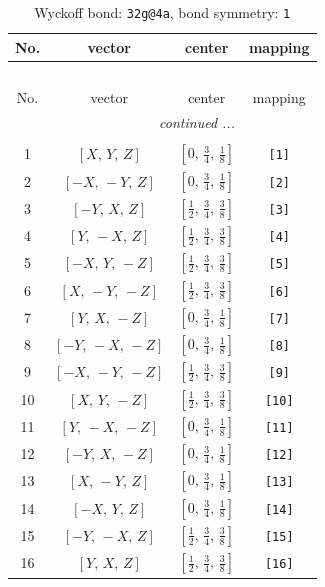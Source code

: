 \documentclass[fleqn,8pt]{jsarticle}
\begin{document}
\begin{longtable}{cccc}
\caption{Wyckoff bond: {\tt 32g@4a}, bond symmetry: {\tt 1}}
 \\
 \hline \hline
No. & vector & center & mapping \\ \hline \endfirsthead

\multicolumn{3}{l}{\tablename\ \thetable{}} \\
 \hline \hline
No. & vector & center & mapping \\ \hline \endhead

 \hline \hline
\multicolumn{3}{r}{\footnotesize\it continued ...} \\ \endfoot

 \hline \hline
\multicolumn{3}{r}{} \\ \endlastfoot

1 & $\left[ X,\, Y,\, Z \right]$ & $\left[ 0,\, \frac{3}{4},\, \frac{1}{8} \right]$ & {\tt [1]} \\ \hline
2 & $\left[ - X,\, - Y,\, Z \right]$ & $\left[ 0,\, \frac{3}{4},\, \frac{1}{8} \right]$ & {\tt [2]} \\ \hline
3 & $\left[ - Y,\, X,\, Z \right]$ & $\left[ \frac{1}{2},\, \frac{3}{4},\, \frac{3}{8} \right]$ & {\tt [3]} \\ \hline
4 & $\left[ Y,\, - X,\, Z \right]$ & $\left[ \frac{1}{2},\, \frac{3}{4},\, \frac{3}{8} \right]$ & {\tt [4]} \\ \hline
5 & $\left[ - X,\, Y,\, - Z \right]$ & $\left[ \frac{1}{2},\, \frac{3}{4},\, \frac{3}{8} \right]$ & {\tt [5]} \\ \hline
6 & $\left[ X,\, - Y,\, - Z \right]$ & $\left[ \frac{1}{2},\, \frac{3}{4},\, \frac{3}{8} \right]$ & {\tt [6]} \\ \hline
7 & $\left[ Y,\, X,\, - Z \right]$ & $\left[ 0,\, \frac{3}{4},\, \frac{1}{8} \right]$ & {\tt [7]} \\ \hline
8 & $\left[ - Y,\, - X,\, - Z \right]$ & $\left[ 0,\, \frac{3}{4},\, \frac{1}{8} \right]$ & {\tt [8]} \\ \hline
9 & $\left[ - X,\, - Y,\, - Z \right]$ & $\left[ \frac{1}{2},\, \frac{3}{4},\, \frac{3}{8} \right]$ & {\tt [9]} \\ \hline
10 & $\left[ X,\, Y,\, - Z \right]$ & $\left[ \frac{1}{2},\, \frac{3}{4},\, \frac{3}{8} \right]$ & {\tt [10]} \\ \hline
11 & $\left[ Y,\, - X,\, - Z \right]$ & $\left[ 0,\, \frac{3}{4},\, \frac{1}{8} \right]$ & {\tt [11]} \\ \hline
12 & $\left[ - Y,\, X,\, - Z \right]$ & $\left[ 0,\, \frac{3}{4},\, \frac{1}{8} \right]$ & {\tt [12]} \\ \hline
13 & $\left[ X,\, - Y,\, Z \right]$ & $\left[ 0,\, \frac{3}{4},\, \frac{1}{8} \right]$ & {\tt [13]} \\ \hline
14 & $\left[ - X,\, Y,\, Z \right]$ & $\left[ 0,\, \frac{3}{4},\, \frac{1}{8} \right]$ & {\tt [14]} \\ \hline
15 & $\left[ - Y,\, - X,\, Z \right]$ & $\left[ \frac{1}{2},\, \frac{3}{4},\, \frac{3}{8} \right]$ & {\tt [15]} \\ \hline
16 & $\left[ Y,\, X,\, Z \right]$ & $\left[ \frac{1}{2},\, \frac{3}{4},\, \frac{3}{8} \right]$ & {\tt [16]} \\
\end{longtable}
\end{document}
